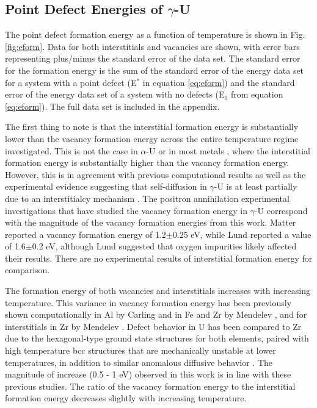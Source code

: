 \documentclass[review]{elsarticle}
\begin{document}
\FloatBarrier

\subsection{Point Defect Energies of $\gamma$-U}

The point defect formation energy as a function of temperature is shown in Fig. \ref{fig:eform}. Data for both interstitials and vacancies are shown, with error bars representing plus/minus the standard error of the data set. The standard error for the formation energy is the sum of the standard error of the energy data set for a system with a point defect (E$^*$ in equation \ref{eq:eform}) and the standard error of the energy data set of a system with no defects (E$_0$ from equation \ref{eq:eform}). The full data set is included in the appendix.

The first thing to note is that the interstitial formation energy is substantially lower than the vacancy formation energy across the entire temperature regime investigated. This is not the case in $\alpha$-U \cite{wirth2011} or in most metals \cite{schultz1968, baskes1979, lee2001, lee2003}, where the interstitial formation energy is substantially higher than the vacancy formation energy. However, this is in agreement with previous computational results \cite{beeler2010} as well as the experimental evidence suggesting that self-diffusion in $\gamma$-U is at least partially due to an interstitialcy mechanism \cite{fedorov1978, smirnov1992, mehrer2011}. The positron annihilation experimental investigations that have studied the vacancy formation energy in $\gamma$-U correspond with the magnitude of the vacancy formation energies from this work. Matter \cite{matter1980} reported a vacancy formation energy of 1.2$\pm$0.25 eV, while Lund \cite{lund2013} reported a value of 1.6$\pm$0.2 eV, although Lund suggested that oxygen impurities likely affected their results. There are no experimental results of interstitial formation energy for comparison.

The formation energy of both vacancies and interstitials increases with increasing temperature. This variance in vacancy formation energy has been previously shown computationally in Al by Carling \cite{carling2003} and in Fe and Zr by Mendelev \cite{mendelev2009, mendelev2010}, and for interstitials in Zr by Mendelev \cite{mendelev2010}. Defect behavior in U has been compared to Zr due to the hexagonal-type ground state structures for both elements, paired with high temperature bcc structures that are mechanically unstable at lower temperatures, in addition to similar anomalous diffusive behavior \cite{matter1980,kidson1961}. The magnitude of increase (0.5 - 1 eV) observed in this work is in line with these previous studies. The ratio of the vacancy formation energy to the interstitial formation energy decreases slightly with increasing temperature.
\end{document}

